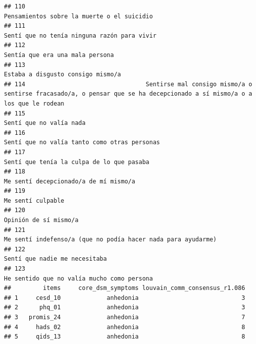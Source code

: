 \documentclass[
]{article}
\begin{document}
\begin{verbatim}
## 110                                                                                                               Pensamientos sobre la muerte o el suicidio
## 111                                                                                                              Sentí que no tenía ninguna razón para vivir
## 112                                                                                                                          Sentía que era una mala persona
## 113                                                                                                                        Estaba a disgusto consigo mismo/a
## 114                                  Sentirse mal consigo mismo/a o sentirse fracasado/a, o pensar que se ha decepcionado a sí mismo/a o a los que le rodean
## 115                                                                                                                                  Sentí que no valía nada
## 116                                                                                                             Sentí que no valía tanto como otras personas
## 117                                                                                                                Sentí que tenía la culpa de lo que pasaba
## 118                                                                                                                    Me sentí decepcionado/a de mí mismo/a
## 119                                                                                                                                        Me sentí culpable
## 120                                                                                                                                    Opinión de sí mismo/a
## 121                                                                                             Me sentí indefenso/a (que no podía hacer nada para ayudarme)
## 122                                                                                                                            Sentí que nadie me necesitaba
## 123                                                                                                               He sentido que no valía mucho como persona
##         items     core_dsm_symptoms louvain_comm_consensus_r1.086
## 1     cesd_10             anhedonia                             3
## 2      phq_01             anhedonia                             3
## 3   promis_24             anhedonia                             7
## 4     hads_02             anhedonia                             8
## 5     qids_13             anhedonia                             8

\end{verbatim}
\end{document}
